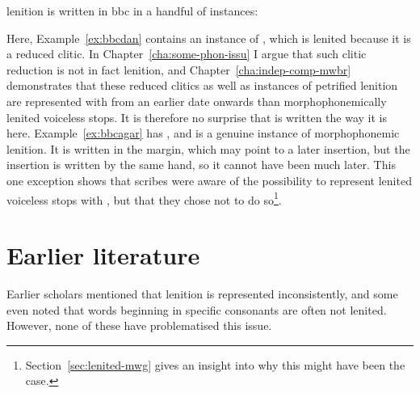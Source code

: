 lenition is written in \gls{bbc} in a handful of instances:
\begin{mwl}
\end{mwl}
Here, Example~\ref{ex:bbcdan} contains an instance of , which is lenited because it is a reduced clitic. In Chapter~\ref{cha:some-phon-issu} I argue that such clitic reduction is not in fact lenition, and Chapter~\ref{cha:indep-comp-mwbr} demonstrates that these reduced clitics as well as instances of petrified lenition are represented with  from an earlier date onwards than morphophonemically lenited voiceless stops. It is therefore no surprise that  is written the way it is here. Example~\ref{ex:bbcagar} has , and is a genuine instance of morphophonemic lenition. It is written in the margin, which may point to a later insertion, but the insertion is written by the same hand, so it cannot have been much later. This one exception shows that scribes were aware of the possibility to represent lenited voiceless stops with , but that they chose not to do so\footnote{Section~\ref{sec:lenited-mwg} gives an insight into why this might have been the case.}.


\section{Earlier literature}
\label{sec:earlier-literature}
Earlier scholars mentioned that lenition is represented inconsistently, and some even noted that words beginning in specific consonants are often not lenited. However, none of these have problematised this issue.

